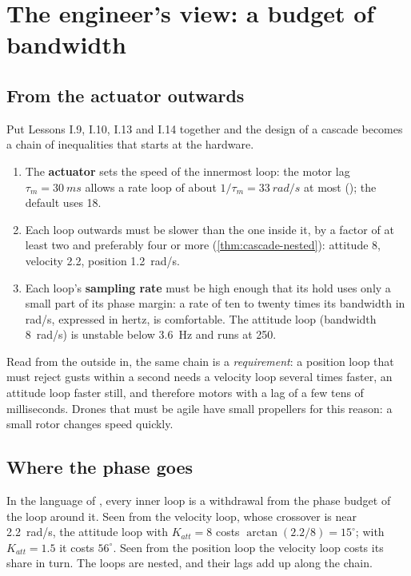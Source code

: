 \section{The engineer's view: a budget of bandwidth}

\subsection{From the actuator outwards}
Put Lessons I.9, I.10, I.13 and I.14 together and the design of a cascade becomes a chain of inequalities that starts at the hardware.
\begin{enumerate}
  \item The \textbf{actuator} sets the speed of the innermost loop: the motor lag $\tau_m = \SI{30}{ms}$ allows a rate loop of about $1/\tau_m = \SI{33}{rad/s}$ at most (); the default uses 18.
  \item Each loop outwards must be slower than the one inside it, by a factor of at least two and preferably four or more (\cref{thm:cascade-nested}): attitude 8, velocity 2.2, position \SI{1.2}{rad/s}.
  \item Each loop's \textbf{sampling rate} must be high enough that its hold uses only a small part of its phase margin: a rate of ten to twenty times its bandwidth in \si{rad/s}, expressed in hertz, is comfortable. The attitude loop (bandwidth \SI{8}{rad/s}) is unstable below \SI{3.6}{Hz} and runs at 250.
\end{enumerate}
Read from the outside in, the same chain is a \emph{requirement}: a position loop that must reject gusts within a second needs a velocity loop several times faster, an attitude loop faster still, and therefore motors with a lag of a few tens of milliseconds. Drones that must be agile have small propellers for this reason: a small rotor changes speed quickly.

\subsection{Where the phase goes}
In the language of , every inner loop is a withdrawal from the phase budget of the loop around it. Seen from the velocity loop, whose crossover is near \SI{2.2}{rad/s}, the attitude loop with $K_{att} = 8$ costs $\arctan(2.2/8) = 15^\circ$; with $K_{att} = 1.5$ it costs $56^\circ$. Seen from the position loop the velocity loop costs its share in turn. The loops are nested, and their lags add up along the chain.

